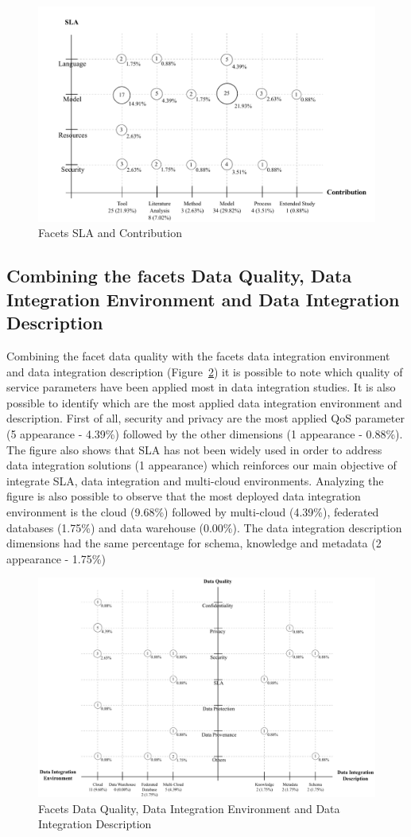 \begin{figure}[h!]
\centering
\includegraphics[scale=0.65]{figs/bubble-charts/SLA-Contribution.pdf}
\caption{Facets SLA and Contribution}\label{fig:facet3}
\end{figure}


\subsection{Combining the facets Data Quality, Data Integration Environment and Data Integration Description}

Combining the facet data quality with the facets data integration environment and data integration description
(Figure~\ref{fig:facet4}) it is possible to note which quality of service parameters have been applied most in
data integration studies.
It is also possible to identify which are the most applied data integration environment and description.
First of all, security and privacy are the most applied QoS parameter (5 appearance - 4.39\%)
followed by the other dimensions (1 appearance - 0.88\%). 
The figure also shows that SLA has not been widely used in order to address data integration solutions
(1 appearance) which reinforces our main objective of integrate SLA, data integration and multi-cloud 
environments. 
Analyzing the figure is also possible to observe that the most deployed data integration environment is 
the cloud (9.68\%) followed by multi-cloud (4.39\%), federated databases (1.75\%) and data warehouse (0.00\%).
The data integration description dimensions had the same percentage for schema, knowledge and metadata (2 appearance - 1.75\%)

\begin{figure}[h!]
\centering
\includegraphics[scale=0.53]{figs/bubble-charts/Data-Quality-DI.pdf}
\caption{Facets Data Quality, Data Integration Environment and Data Integration Description}\label{fig:facet4}
\end{figure}
